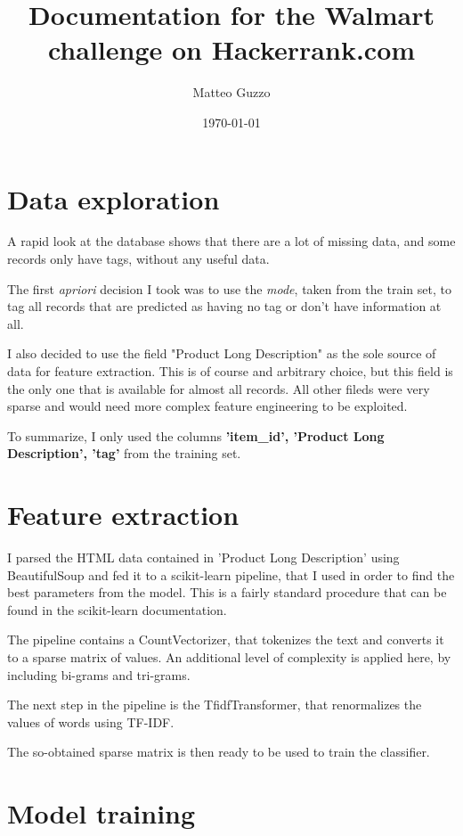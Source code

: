 \documentclass{article}
\author{Matteo Guzzo}
\date{\today}
\title{Documentation for the Walmart challenge on Hackerrank.com}
\begin{document}
\maketitle

\section{Data exploration}

A rapid look at the database shows that there are a lot of missing data, and
some records only have tags, without any useful data.

The first \emph{apriori} decision I took was to use the \emph{mode},
taken from the train set, to tag all records that are predicted as
having no tag or don't have information at all.

I also decided to use the field "Product Long Description" as the sole
source of data for feature extraction.
This is of course and arbitrary choice, but this field is
the only one that is available for almost all records.
All other fileds were very sparse and would need more complex
feature engineering to be exploited.

To summarize, I only used the columns \textbf{'item\_id', 'Product Long Description', 'tag'}
from the training set.

\section{Feature extraction}

I parsed the HTML data contained in 'Product Long Description' using BeautifulSoup
and fed it to a scikit-learn pipeline, that I used in order to find the best parameters
from the model. This is a fairly standard procedure that can be found in the
scikit-learn documentation.

The pipeline contains a CountVectorizer, that tokenizes the text and converts it to
a sparse matrix of values.
An additional level of complexity is applied here, by including bi-grams and tri-grams.

The next step in the pipeline is the TfidfTransformer,
that renormalizes the values of words using TF-IDF.

The so-obtained sparse matrix is then ready to be used to train the classifier.


\section{Model training}
\end{document}
